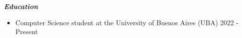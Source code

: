 \documentclass{article}
\begin{document}
\vspace{4mm}
\fontsize{12pt}{0pt}
\begin{center}
    \textit{\textbf{Education}}
\end{center}

\begin{itemize}
\item Computer Science student at the University of Buenos Aires (UBA) \hfil 2022 - Present

\end{itemize}
\end{document}
